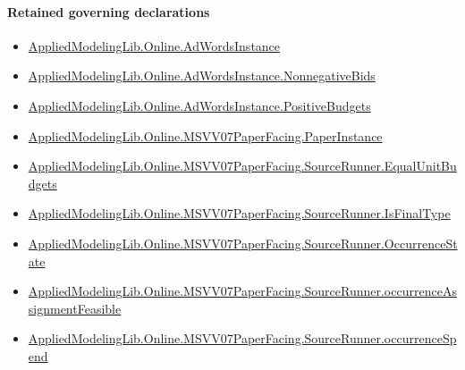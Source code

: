 \documentclass[10pt]{article}
\begin{document}
\paragraph{Retained governing declarations}
\begin{itemize}\raggedright
\item \hyperlink{governing-declaration-e5ce49672bf26ab1}{Applied\allowbreak{}Modeling\allowbreak{}Lib.\allowbreak{}Online.\allowbreak{}Ad\allowbreak{}Words\allowbreak{}Instance}
\item \hyperlink{governing-declaration-7bed8c5ff5e5cde7}{Applied\allowbreak{}Modeling\allowbreak{}Lib.\allowbreak{}Online.\allowbreak{}Ad\allowbreak{}Words\allowbreak{}Instance.\allowbreak{}Nonnegative\allowbreak{}Bids}
\item \hyperlink{governing-declaration-eabdcef9dca00922}{Applied\allowbreak{}Modeling\allowbreak{}Lib.\allowbreak{}Online.\allowbreak{}Ad\allowbreak{}Words\allowbreak{}Instance.\allowbreak{}Positive\allowbreak{}Budgets}
\item \hyperlink{governing-declaration-11907576ec71eeb5}{Applied\allowbreak{}Modeling\allowbreak{}Lib.\allowbreak{}Online.\allowbreak{}MSVV07\allowbreak{}Paper\allowbreak{}Facing.\allowbreak{}Paper\allowbreak{}Instance}
\item \hyperlink{governing-declaration-cf74b8b54a03b174}{Applied\allowbreak{}Modeling\allowbreak{}Lib.\allowbreak{}Online.\allowbreak{}MSVV07\allowbreak{}Paper\allowbreak{}Facing.\allowbreak{}Source\allowbreak{}Runner.\allowbreak{}Equal\allowbreak{}Unit\allowbreak{}Budgets}
\item \hyperlink{paper-prerequisite-b03abe34f2413cec}{Applied\allowbreak{}Modeling\allowbreak{}Lib.\allowbreak{}Online.\allowbreak{}MSVV07\allowbreak{}Paper\allowbreak{}Facing.\allowbreak{}Source\allowbreak{}Runner.\allowbreak{}Is\allowbreak{}Final\allowbreak{}Type}
\item \hyperlink{governing-declaration-2eff7815f49c1d41}{Applied\allowbreak{}Modeling\allowbreak{}Lib.\allowbreak{}Online.\allowbreak{}MSVV07\allowbreak{}Paper\allowbreak{}Facing.\allowbreak{}Source\allowbreak{}Runner.\allowbreak{}Occurrence\allowbreak{}State}
\item \hyperlink{paper-prerequisite-2c878fdf44b4b3b2}{Applied\allowbreak{}Modeling\allowbreak{}Lib.\allowbreak{}Online.\allowbreak{}MSVV07\allowbreak{}Paper\allowbreak{}Facing.\allowbreak{}Source\allowbreak{}Runner.\allowbreak{}occurrence\allowbreak{}Assignment\allowbreak{}Feasible}
\item \hyperlink{governing-declaration-7fc0f371ea84f275}{Applied\allowbreak{}Modeling\allowbreak{}Lib.\allowbreak{}Online.\allowbreak{}MSVV07\allowbreak{}Paper\allowbreak{}Facing.\allowbreak{}Source\allowbreak{}Runner.\allowbreak{}occurrence\allowbreak{}Spend}

\end{itemize}
\end{document}
